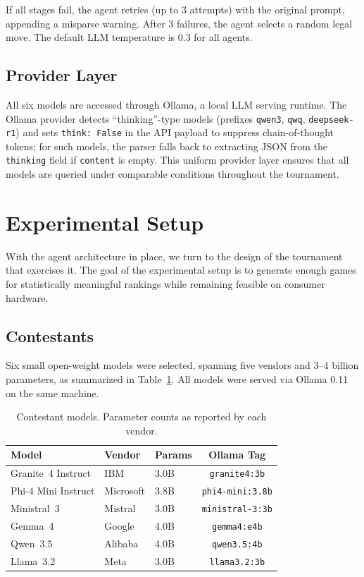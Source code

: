 \documentclass[11pt]{article}
\begin{document}
If all stages fail, the agent retries (up to 3 attempts) with the original prompt, appending a misparse warning. After 3 failures, the agent selects a random legal move. The default LLM temperature is 0.3 for all agents.

\subsection{Provider Layer}

All six models are accessed through Ollama, a local LLM serving runtime. The Ollama provider detects ``thinking''-type models (prefixes \texttt{qwen3}, \texttt{qwq}, \texttt{deepseek-r1}) and sets \texttt{think: False} in the API payload to suppress chain-of-thought tokens; for such models, the parser falls back to extracting JSON from the \texttt{thinking} field if \texttt{content} is empty. This uniform provider layer ensures that all models are queried under comparable conditions throughout the tournament.

\section{Experimental Setup}
\label{sec:setup}

With the agent architecture in place, we turn to the design of the tournament that exercises it. The goal of the experimental setup is to generate enough games for statistically meaningful rankings while remaining feasible on consumer hardware.

\subsection{Contestants}

Six small open-weight models were selected, spanning five vendors and 3--4 billion parameters, as summarized in Table~\ref{tab:models}. All models were served via Ollama 0.11 on the same machine.

\begin{table}[H]
\centering
\caption{Contestant models. Parameter counts as reported by each vendor.}
\label{tab:models}
\begin{tabular}{lllc}
\toprule
\textbf{Model} & \textbf{Vendor} & \textbf{Params} & \textbf{Ollama Tag} \\
\midrule
Granite~4 Instruct         & IBM       & 3.0B & \texttt{granite4:3b} \\
Phi-4 Mini Instruct        & Microsoft & 3.8B & \texttt{phi4-mini:3.8b} \\
Ministral~3                & Mistral   & 3.0B & \texttt{ministral-3:3b} \\
Gemma~4                    & Google    & 4.0B & \texttt{gemma4:e4b} \\
Qwen~3.5                   & Alibaba   & 4.0B & \texttt{qwen3.5:4b} \\
Llama~3.2                  & Meta      & 3.0B & \texttt{llama3.2:3b} \\
\bottomrule
\end{tabular}
\end{table}
\end{document}
